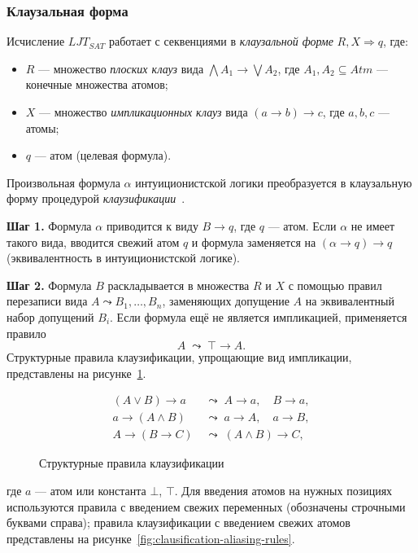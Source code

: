 \documentclass[14pt, russian]{scrartcl}
\begin{document}
\subsubsection{Клаузальная форма}

Исчисление $LJT_{SAT}$ работает с секвенциями в \emph{клаузальной форме}
$R, X \Rightarrow q$, где:
\begin{itemize}
\item $R$ --- множество \emph{плоских клауз} вида $\bigwedge A_1 \rightarrow
  \bigvee A_2$, где $A_1, A_2 \subseteq \mathit{Atm}$ --- конечные множества
  атомов;
\item $X$ --- множество \emph{импликационных клауз} вида $(a \rightarrow b)
  \rightarrow c$, где $a, b, c$ --- атомы;
\item $q$ --- атом (целевая формула).
\end{itemize}

Произвольная формула $\alpha$ интуиционистской логики преобразуется в
клаузальную форму процедурой \emph{клаузификации}~\cite{ClaessenRosen2015}.

\textbf{Шаг 1.} Формула $\alpha$ приводится к виду $B \rightarrow q$, где $q$ ---
атом. Если $\alpha$ не имеет такого вида, вводится свежий атом $q$ и формула
заменяется на $(\alpha \rightarrow q) \rightarrow q$ (эквивалентность в
интуиционистской логике).

\textbf{Шаг 2.} Формула $B$ раскладывается в множества $R$ и $X$ с помощью
правил перезаписи вида $A \leadsto B_1, \ldots, B_n$, заменяющих допущение $A$
на эквивалентный набор допущений $B_i$. Если формула ещё не является импликацией,
применяется правило
\[
A \;\leadsto\; \top \rightarrow A.
\]
Структурные правила клаузификации, упрощающие вид импликации, представлены на рисунке~\ref{fig:clausification-structural-rules}.

\begin{figure}[!htb]
\centering
\begin{align*}
(A \lor B) \rightarrow a &\;\leadsto\; A \rightarrow a,\quad B \rightarrow a, \\
a \rightarrow (A \land B) &\;\leadsto\; a \rightarrow A,\quad a \rightarrow B, \\
A \rightarrow (B \rightarrow C) &\;\leadsto\; (A \land B) \rightarrow C,
\end{align*}
\caption{Структурные правила клаузификации}
\label{fig:clausification-structural-rules}
\end{figure}
где $a$ --- атом или константа $\bot$, $\top$. Для введения атомов на нужных
позициях используются правила с введением свежих переменных (обозначены строчными
буквами справа); правила клаузификации с введением свежих атомов представлены на рисунке~\ref{fig:clausification-aliasing-rules}.
\end{document}
